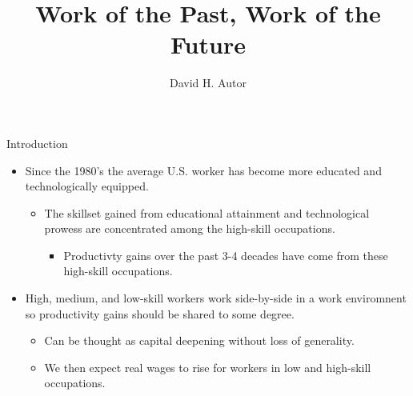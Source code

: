 \documentclass{beamer}
\title{Work of the Past, Work of the Future}
\author{David H. Autor}
\begin{document}
	
\begin{frame}

    \maketitle
    
\end{frame}

\begin{frame}{Introduction}

\begin{itemize}
	
	\item Since the 1980's the average U.S. worker has become more educated and technologically equipped.
	
	\begin{itemize}
		
		\item The skillset gained from educational attainment and technological prowess are concentrated among the high-skill occupations.
		
		\begin{itemize}
			
			\item Productivty gains over the past 3-4 decades have come from these high-skill occupations.
			
		\end{itemize}
		
	\end{itemize}

	\bigskip
	
	\item High, medium, and low-skill workers work side-by-side in a work enviromnent so productivity gains should be shared to some degree.
	
	\begin{itemize}
		
		\item Can be thought as capital deepening without loss of generality.
		
		\item We then expect real wages to rise for workers in low and high-skill occupations.
		
	\end{itemize}
	
\end{itemize}

\end{frame}
\end{document}
